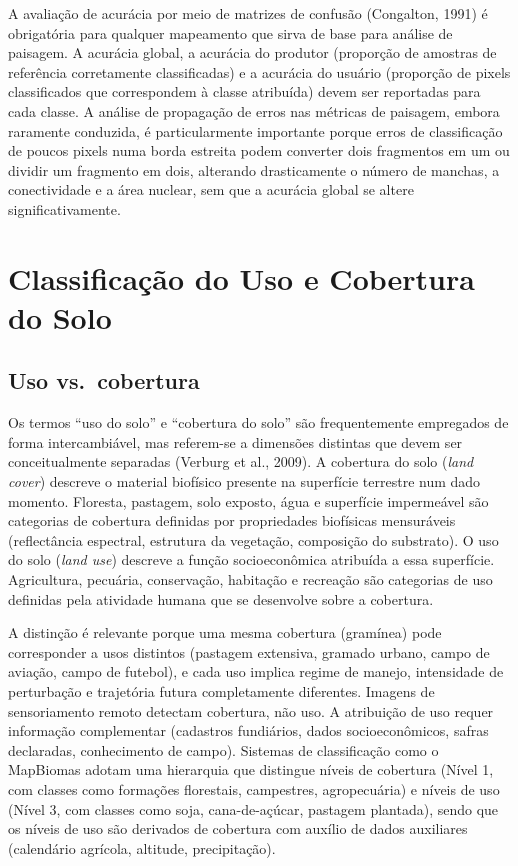 \documentclass[
  portuguese,
  11pt,
  a4paper,
  open=any]{scrbook}
\begin{document}
A avaliação de acurácia por meio de matrizes de confusão (Congalton,
1991) é obrigatória para qualquer mapeamento que sirva de base para
análise de paisagem. A acurácia global, a acurácia do produtor
(proporção de amostras de referência corretamente classificadas) e a
acurácia do usuário (proporção de pixels classificados que correspondem
à classe atribuída) devem ser reportadas para cada classe. A análise de
propagação de erros nas métricas de paisagem, embora raramente
conduzida, é particularmente importante porque erros de classificação de
poucos pixels numa borda estreita podem converter dois fragmentos em um
ou dividir um fragmento em dois, alterando drasticamente o número de
manchas, a conectividade e a área nuclear, sem que a acurácia global se
altere significativamente.

\chapter{Classificação do Uso e Cobertura do
Solo}\label{sec-uso-cobertura}

\section{Uso vs.~cobertura}\label{uso-vs.-cobertura}

Os termos ``uso do solo'' e ``cobertura do solo'' são frequentemente
empregados de forma intercambiável, mas referem-se a dimensões distintas
que devem ser conceitualmente separadas (Verburg et al., 2009). A
cobertura do solo (\emph{land cover}) descreve o material biofísico
presente na superfície terrestre num dado momento. Floresta, pastagem,
solo exposto, água e superfície impermeável são categorias de cobertura
definidas por propriedades biofísicas mensuráveis (reflectância
espectral, estrutura da vegetação, composição do substrato). O uso do
solo (\emph{land use}) descreve a função socioeconômica atribuída a essa
superfície. Agricultura, pecuária, conservação, habitação e recreação
são categorias de uso definidas pela atividade humana que se desenvolve
sobre a cobertura.

A distinção é relevante porque uma mesma cobertura (gramínea) pode
corresponder a usos distintos (pastagem extensiva, gramado urbano, campo
de aviação, campo de futebol), e cada uso implica regime de manejo,
intensidade de perturbação e trajetória futura completamente diferentes.
Imagens de sensoriamento remoto detectam cobertura, não uso. A
atribuição de uso requer informação complementar (cadastros fundiários,
dados socioeconômicos, safras declaradas, conhecimento de campo).
Sistemas de classificação como o MapBiomas adotam uma hierarquia que
distingue níveis de cobertura (Nível 1, com classes como formações
florestais, campestres, agropecuária) e níveis de uso (Nível 3, com
classes como soja, cana-de-açúcar, pastagem plantada), sendo que os
níveis de uso são derivados de cobertura com auxílio de dados auxiliares
(calendário agrícola, altitude, precipitação).
\end{document}

